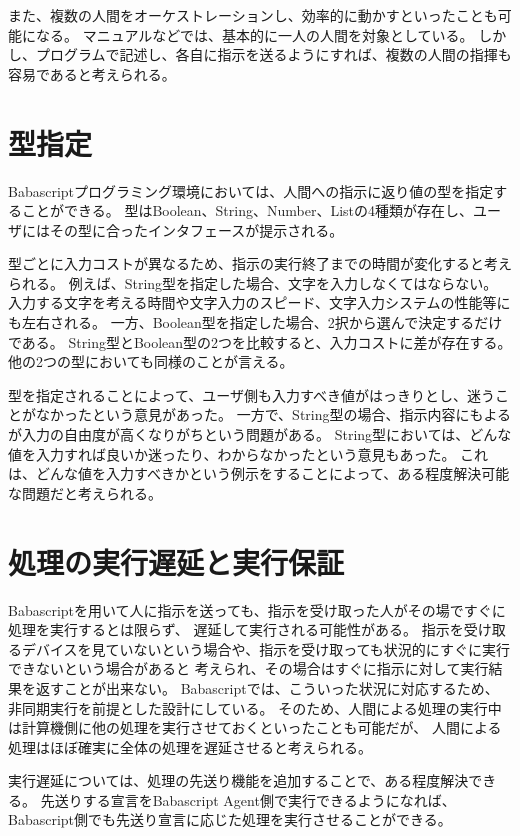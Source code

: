 また、複数の人間をオーケストレーションし、効率的に動かすといったことも可能になる。
マニュアルなどでは、基本的に一人の人間を対象としている。
しかし、プログラムで記述し、各自に指示を送るようにすれば、複数の人間の指揮も容易であると考えられる。

\section{型指定}\label{ux578bux6307ux5b9a}

Babascriptプログラミング環境においては、人間への指示に返り値の型を指定することができる。
型はBoolean、String、Number、Listの4種類が存在し、ユーザにはその型に合ったインタフェースが提示される。

型ごとに入力コストが異なるため、指示の実行終了までの時間が変化すると考えられる。
例えば、String型を指定した場合、文字を入力しなくてはならない。
入力する文字を考える時間や文字入力のスピード、文字入力システムの性能等にも左右される。
一方、Boolean型を指定した場合、2択から選んで決定するだけである。
String型とBoolean型の2つを比較すると、入力コストに差が存在する。
他の2つの型においても同様のことが言える。

型を指定されることによって、ユーザ側も入力すべき値がはっきりとし、迷うことがなかったという意見があった。
一方で、String型の場合、指示内容にもよるが入力の自由度が高くなりがちという問題がある。
String型においては、どんな値を入力すれば良いか迷ったり、わからなかったという意見もあった。
これは、どんな値を入力すべきかという例示をすることによって、ある程度解決可能な問題だと考えられる。

\section{処理の実行遅延と実行保証}\label{ux51e6ux7406ux306eux5b9fux884cux9045ux5ef6ux3068ux5b9fux884cux4fddux8a3c}

Babascriptを用いて人に指示を送っても、指示を受け取った人がその場ですぐに処理を実行するとは限らず、
遅延して実行される可能性がある。
指示を受け取るデバイスを見ていないという場合や、指示を受け取っても状況的にすぐに実行できないという場合があると
考えられ、その場合はすぐに指示に対して実行結果を返すことが出来ない。
Babascriptでは、こういった状況に対応するため、非同期実行を前提とした設計にしている。
そのため、人間による処理の実行中は計算機側に他の処理を実行させておくといったことも可能だが、
人間による処理はほぼ確実に全体の処理を遅延させると考えられる。

実行遅延については、処理の先送り機能を追加することで、ある程度解決できる。
先送りする宣言をBabascript Agent側で実行できるようになれば、
Babascript側でも先送り宣言に応じた処理を実行させることができる。

